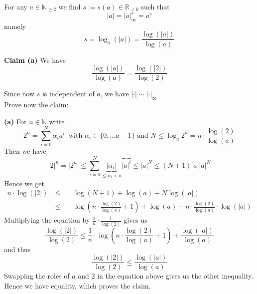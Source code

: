 \documentclass[12pt]{book}
\begin{document}
\begin{spacing}{1.3}
\begin{compactenum}
For any $a \in \mathbb{N}_{\geqslant 2}$ we find $s:=s(a) \in \mathbb{R}_{<0}$ such that
$$|a|=|a|_{\infty}^s=a^s$$
namely
$$s=\log_a(|a|)=\frac{\log(|a|)}{\log(a)}$$
\begin{compactenum}
\item[\textbf{Claim (a)}] We have $$\frac{\log(|a|)}{\log(a)}=\frac{\log(|2|)}{\log(2)}$$
\end{compactenum}
Since now $s$ is independent of $a$, we have $|\cdot|\sim |\cdot |_{\infty}$.\\
Prove now the claim:
\begin{compactenum}
\item[\textbf{(a)}]
For $n \in \mathbb{N}$ write 
$$2^n= \sum_{i=0}^N \alpha_i a^{i} \ \textrm{ with }\alpha_i \in \{0, \ldots a-1\} \textrm{ and } N \leqslant \log_a2^n=n \cdot \frac{\log(2)}{\log(a)}$$
Then we have
$$\vert 2\vert ^n= \vert2^n \vert \leqslant \sum_{i=0}^N \underbrace{\vert \alpha_i \vert}_{\leqslant \alpha_i <a} \overbrace{\vert a \vert ^{i}}{\leqslant \vert a \vert ^N} \leqslant (N+1) ^\cdot a \cdot \vert a \vert ^N$$
Hence we get
\begin{alignat*}{5}
n \cdot \log(|2|) \ &\leqslant && \ \log(N+1)+\log(a)+N\log(|a|)\\
& \leqslant && \  \log\left(n \cdot \frac{\log(2)}{\log(a)}+1\right)+\log(a)+n\cdot \frac{\log(2)}{\log(a)}\cdot \log(|a|)
\end{alignat*}
Multiplying the equation by $\frac{1}{n} \cdot \frac{1}{\log(2)}$ gives us
$$\frac{\log(|2|)}{\log(2)} \leqslant \frac{1}{n} \cdot \log\left(n \cdot \frac{\log(2)}{\log(a)}+1\right)+ \frac{\log(|a|)}{\log(a)}$$ and thus 
$$\frac{\log(|2|)}{\log(2)} \leqslant \frac{\log(|a|)}{\log(a)}$$
Swapping the roles of $a$ and $2$ in the equation above gives us the other inequality. Hence we have equality, which proves the claim.
\end{compactenum}
\end{compactenum}


\end{spacing}
\end{document}
